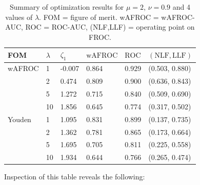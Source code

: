 \documentclass[
]{book}
\begin{document}
\begin{table}

\caption{\label{tab:optim-op-point-table-vary-lambda}Summary of optimization results for $\mu = 2$, $\nu = 0.9$ and 4 values of $\lambda$. FOM = figure of merit. wAFROC = wAFROC-AUC, ROC = ROC-AUC, (NLF,LLF) = operating point on FROC.}
\centering
\fontsize{10}{12}\selectfont
\begin{tabular}[t]{llllll}
\toprule
FOM & $\lambda$ & $\zeta_1$ & $\text{wAFROC}$ & $\text{ROC}$ & $\left( \text{NLF}, \text{LLF}\right)$\\
\midrule
wAFROC & 1 & -0.007 & 0.864 & 0.929 & (0.503, 0.880)\\
 & 2 & 0.474 & 0.809 & 0.900 & (0.636, 0.843)\\
 & 5 & 1.272 & 0.715 & 0.840 & (0.509, 0.690)\\
 & 10 & 1.856 & 0.645 & 0.774 & (0.317, 0.502)\\
Youden & 1 & 1.095 & 0.831 & 0.899 & (0.137, 0.735)\\
\addlinespace
 & 2 & 1.362 & 0.781 & 0.865 & (0.173, 0.664)\\
 & 5 & 1.695 & 0.705 & 0.811 & (0.225, 0.558)\\
 & 10 & 1.934 & 0.644 & 0.766 & (0.265, 0.474)\\
\bottomrule
\end{tabular}
\end{table}

Inspection of this table reveals the following:
\end{document}
